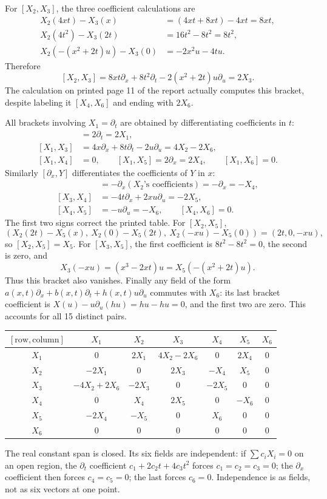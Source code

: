 \documentclass[11pt,a4paper]{article}
\numberwithin{equation}{section}
\theoremstyle{definition}
\theoremstyle{plain}
\theoremstyle{remark}
\begin{document}
For $[X_2,X_3]$, the three coefficient calculations are
\begin{align*}
X_2(4xt)-X_3(x)&=(4xt+8xt)-4xt=8xt,\\
X_2(4t^2)-X_3(2t)&=16t^2-8t^2=8t^2,\\
X_2(-(x^2+2t)u)-X_3(0)&=-2x^2u-4tu.
\end{align*}
Therefore
\[
[X_2,X_3]=8xt\partial_x+8t^2\partial_t-2(x^2+2t)u\partial_u=2X_3.
\]
The calculation on printed page 11 of the report actually computes this bracket, despite labeling it $[X_4,X_6]$ and ending with $2X_6$.

All brackets involving $X_1=\partial_t$ are obtained by differentiating coefficients in $t$:
\begin{align*}
[X_1,X_2]&=2\partial_t=2X_1,\\
[X_1,X_3]&=4x\partial_x+8t\partial_t-2u\partial_u=4X_2-2X_6,\\
[X_1,X_4]&=0,\qquad [X_1,X_5]=2\partial_x=2X_4,\qquad [X_1,X_6]=0.
\end{align*}
Similarly $[\partial_x,Y]$ differentiates the coefficients of $Y$ in $x$:
\begin{align*}
[X_2,X_4]&=-\partial_x(X_2\text{'s coefficients})=-\partial_x=-X_4,\\
[X_3,X_4]&=-4t\partial_x+2xu\partial_u=-2X_5,\\
[X_4,X_5]&=-u\partial_u=-X_6,\qquad [X_4,X_6]=0.
\end{align*}
The first two signs correct the printed table. For $[X_2,X_5]$,
\[
(X_2(2t)-X_5(x),\ X_2(0)-X_5(2t),\ X_2(-xu)-X_5(0))
=(2t,0,-xu),
\]
so $[X_2,X_5]=X_5$. For $[X_3,X_5]$, the first coefficient is $8t^2-8t^2=0$, the second is zero, and
\[
X_3(-xu)=(x^3-2xt)u
=X_5(-(x^2+2t)u).
\]
Thus this bracket also vanishes. Finally any field of the form
$a(x,t)\partial_x+b(x,t)\partial_t+h(x,t)u\partial_u$ commutes with $X_6$:
its last bracket coefficient is $X(u)-u\partial_u(hu)=hu-hu=0$, and the first two are zero. This accounts for all 15 distinct pairs.

\begin{center}\small
\setlength{\tabcolsep}{5pt}\renewcommand{\arraystretch}{1.3}
\begin{tabular}{c|cccccc}
$[\text{row},\text{column}]$ & $X_1$&$X_2$&$X_3$&$X_4$&$X_5$&$X_6$\\\hline
$X_1$&0&$2X_1$&$4X_2-2X_6$&0&$2X_4$&0\\
$X_2$&$-2X_1$&0&$2X_3$&$-X_4$&$X_5$&0\\
$X_3$&$-4X_2+2X_6$&$-2X_3$&0&$-2X_5$&0&0\\
$X_4$&0&$X_4$&$2X_5$&0&$-X_6$&0\\
$X_5$&$-2X_4$&$-X_5$&0&$X_6$&0&0\\
$X_6$&0&0&0&0&0&0
\end{tabular}
\end{center}
The real constant span is closed. Its six fields are independent: if $\sum c_iX_i=0$ on an open region, the $\partial_t$ coefficient $c_1+2c_2t+4c_3t^2$ forces $c_1=c_2=c_3=0$; the $\partial_x$ coefficient then forces $c_4=c_5=0$; the last forces $c_6=0$. Independence is as fields, not as six vectors at one point.
\end{document}

